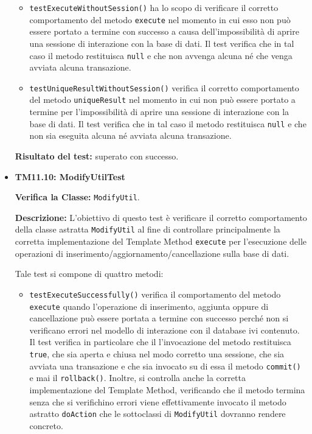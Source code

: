 \begin{itemize}
\begin{itemize}
\item \texttt{testExecuteWithoutSession()} ha lo scopo di verificare il corretto comportamento del metodo \texttt{execute} nel momento in cui esso non può essere portato a termine con successo a causa dell'impossibilità di aprire una sessione di interazione con la base di dati. Il test verifica che in tal caso il metodo restituisca \texttt{null} e che non avvenga alcuna  né che venga avviata alcuna transazione.

\item \texttt{testUniqueResultWithoutSession()} verifica il corretto comportamento del metodo \texttt{uniqueResult} nel momento in cui non può essere portato a termine per l'impossibilità di aprire una sessione di interazione con la base di dati. Il test verifica che in tal caso il metodo restituisca \texttt{null} e che non sia eseguita alcuna  né avviata alcuna transazione.

\end{itemize}
\textbf{Risultato del test:} superato con successo.

\item[\passed] \textbf{TM11.10: ModifyUtilTest}

\textbf{Verifica la Classe:} \texttt{ModifyUtil}.

\textbf{Descrizione:} L'obiettivo di questo test è verificare il corretto comportamento della classe astratta \texttt{ModifyUtil} al fine di controllare principalmente la corretta implementazione del Template Method \texttt{execute} per l'esecuzione delle operazioni di inserimento/aggiornamento/cancellazione sulla base di dati.

Tale test si compone di quattro metodi:
\begin{itemize}
  \item \texttt{testExecuteSuccessfully()} verifica il comportamento del metodo \texttt{execute} quando l'operazione di inserimento, aggiunta oppure di cancellazione può essere portata a termine con successo perché non si verificano errori nel modello di interazione con il database ivi contenuto. Il test verifica in particolare che il l'invocazione del metodo restituisca \texttt{true}, che sia aperta e chiusa nel modo corretto una sessione, che sia avviata una transazione e che sia invocato su di essa il metodo \texttt{commit()} e mai il \texttt{rollback()}. Inoltre, si controlla anche la corretta implementazione del  Template Method, verificando che il metodo termina senza che si verifichino errori viene effettivamente invocato il metodo astratto \texttt{doAction} che le sottoclassi di \texttt{ModifyUtil} dovranno rendere concreto.
  

\end{itemize}
\end{itemize}
